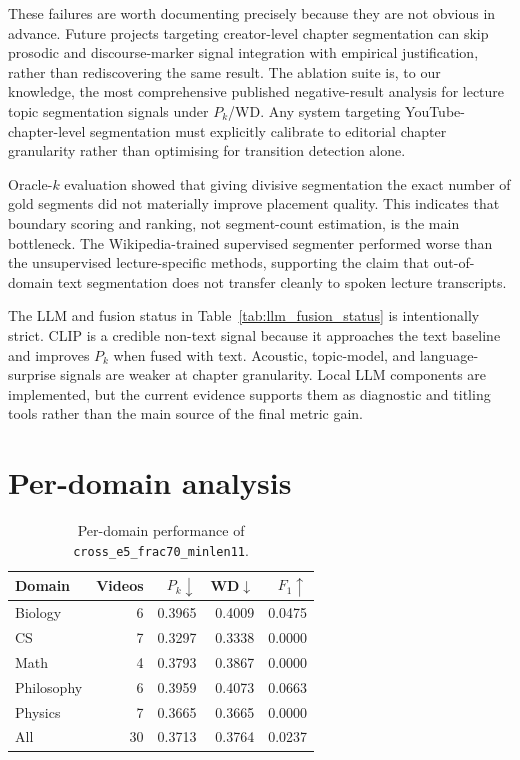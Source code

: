 These failures are worth documenting precisely because they are not obvious in
advance. Future projects targeting creator-level chapter segmentation can skip
prosodic and discourse-marker signal integration with empirical justification,
rather than rediscovering the same result.
The \lecseg{} ablation suite is, to our knowledge, the most comprehensive
published negative-result analysis for lecture topic segmentation signals
under $P_k$/WD.
Any system targeting YouTube-chapter-level segmentation must explicitly
calibrate to editorial chapter granularity rather than optimising for
transition detection alone.

Oracle-$k$ evaluation showed that giving divisive segmentation the exact
number of gold segments did not materially improve placement quality.
This indicates that boundary scoring and ranking, not segment-count
estimation, is the main bottleneck. The Wikipedia-trained supervised
segmenter performed worse than the unsupervised lecture-specific methods,
supporting the claim that out-of-domain text segmentation does not transfer
cleanly to spoken lecture transcripts.

The LLM and fusion status in Table~\ref{tab:llm_fusion_status} is intentionally
strict. CLIP is a credible non-text signal because it approaches the text
baseline and improves $P_k$ when fused with text. Acoustic, topic-model, and
language-surprise signals are weaker at chapter granularity. Local LLM
components are implemented, but the current evidence supports them as
diagnostic and titling tools rather than the main source of the final metric gain.

\section{Per-domain analysis}
\label{sec:domain}

\begin{table}[t]
  \centering
  \caption{Per-domain performance of \texttt{cross\_e5\_frac70\_minlen11}.}
  \label{tab:domain}
  \begin{tabular}{lrrrr}
    \toprule
    Domain & Videos & $P_k\downarrow$ & WD$\downarrow$ & $F_1\uparrow$ \\
    \midrule
    Biology & 6 & 0.3965 & 0.4009 & 0.0475 \\
    CS & 7 & 0.3297 & 0.3338 & 0.0000 \\
    Math & 4 & 0.3793 & 0.3867 & 0.0000 \\
    Philosophy & 6 & 0.3959 & 0.4073 & 0.0663 \\
    Physics & 7 & 0.3665 & 0.3665 & 0.0000 \\
    \midrule
    All & 30 & 0.3713 & 0.3764 & 0.0237 \\
    \bottomrule
  \end{tabular}
\end{table}

